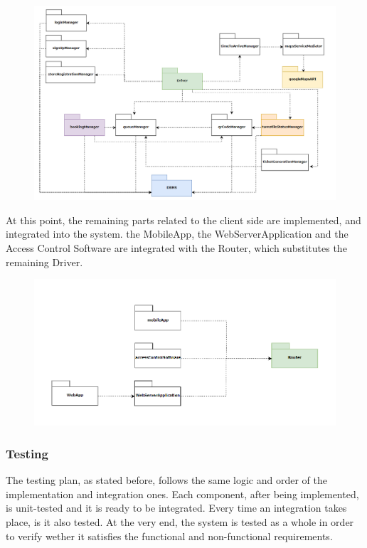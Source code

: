 \documentclass{article}
\begin{document}
\smallskip\\
\begin{figure}[H]
  \includegraphics[width=\linewidth]{INTEGR4.png}
  
\end{figure}
At this point, the remaining parts related to the client side are implemented, and integrated into the system. the MobileApp, the WebServerApplication and the Access Control Software are integrated with the Router, which substitutes the remaining Driver.\\
\begin{figure}[H]
  \includegraphics[width=\linewidth]{INTEGR5.png}
  
\end{figure}
\subsubsection{Testing}

The testing plan, as stated before, follows the same logic and order of the implementation and integration ones. Each component, after being implemented, is unit-tested and it is ready to be integrated. Every time an integration takes place, is it also tested. At the very end, the system is tested as a whole in order to verify wether it satisfies the functional and non-functional requirements.
\end{document}
